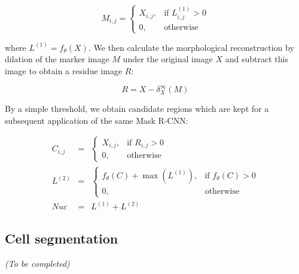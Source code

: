 \begin{equation}
M_{i,j} =
\begin{cases}
    X_{i,j},& \text{if } L^{(1)}_{i,j} > 0 \\
    0,              & \text{otherwise}
\end{cases}
\end{equation}

where $L^{(1)}=f_{\theta}(X)$.
We then calculate the morphological reconstruction by dilation of the marker image $M$ under the original image $X$ and subtract this image to obtain a residue image $R$:

\begin{equation}
R = X - \delta_X^{\infty}(M)
\end{equation}

By a simple threshold, we obtain candidate regions which are kept for a subsequent application of the same Mask R-CNN:

\begin{eqnarray}
C_{i,j} &=&
\begin{cases}
	X_{i,j},& \text{if } R_{i,j} > 0\\
	0, & \text{otherwise}
\end{cases} \\
L^{(2)} &=&
\begin{cases}
	f_{\theta}(C) + \max(L^{(1)}), & \text{if } f_{\theta}(C) > 0\\
	0, & \text{otherwise}
\end{cases}\\
Nuc &=& L^{(1)} + L^{(2)}
\end{eqnarray}

\subsection{Cell segmentation}
\label{subsec:segmentation_cell}

\begin{center}
	\textit{(To be completed)}
\end{center}



